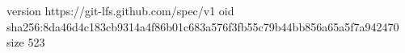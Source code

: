 version https://git-lfs.github.com/spec/v1
oid sha256:8da46d4c183cb9314a4f86b01c683a576f3fb55c79b44bb856a65a5f7a942470
size 523
